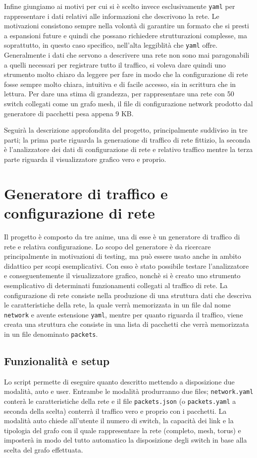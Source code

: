 \documentclass[binding=0.6cm]{sapthesis}
\begin{document}
Infine giungiamo ai motivi per cui si è scelto invece esclusivamente \texttt{yaml} per rappresentare i 
dati relativi alle informazioni che descrivono la rete. Le motivazioni consistono sempre nella volontà
di garantire un formato che si presti a espansioni future e quindi che possano richiedere strutturazioni complesse, ma soprattutto,
in questo caso specifico, nell'alta leggiblità che \texttt{yaml} offre. Generalmente i dati che servono a descrivere una rete non sono mai paragonabili a quelli
necessari per registrare tutto il traffico, si voleva dare quindi uno strumento molto chiaro da leggere per fare in modo che la configurazione di rete
fosse sempre molto chiara, intuitiva e di facile accesso, sia in scrittura che in lettura. 
Per dare una stima di grandezza, per rappresentare una rete con 50 switch collegati come un grafo mesh, il file
di configurazione network prodotto dal generatore di pacchetti pesa appena 9 KB.


Seguirà la descrizione approfondita del progetto, principalmente suddiviso in tre parti; la prima 
parte riguarda la generazione di traffico di rete fittizio, la seconda è l'analizzatore dei dati di configurazione di rete e relativo traffico mentre la terza
parte riguarda il visualizzatore grafico vero e proprio.

\chapter{Generatore di traffico e configurazione di rete}

Il progetto è composto da tre anime, una di esse è un generatore di traffico di rete e relativa configurazione.
Lo scopo del generatore è da ricercare principalmente in motivazioni di testing, ma può essere
 usato anche in ambito didattico per scopi
esemplicativi. Con esso è stato possibile testare l'analizzatore e conseguentemente il visualizzatore grafico, nonchè si è creato 
uno strumento esemplicativo di determinati funzionamenti collegati al traffico di rete.
La configurazione di rete consiste nella produzione di una struttura dati che descriva 
le caratteristiche della rete, la quale
verrà memorizzata in un file dal nome \texttt{network} e avente estensione \texttt{yaml}, mentre per quanto
riguarda il traffico, viene creata una struttura che consiste in una lista di pacchetti che verrà memorizzata in un file denominato \texttt{packets}.

\section{Funzionalità e setup} 
Lo script permette di eseguire quanto descritto mettendo a
 disposizione due modalità, auto e user. Entrambe le modalità produrranno due files; 
 \texttt{network.yaml} conterà le caratteristiche della rete e il file \texttt{packets.json} (o \texttt{packets.yaml}
 a seconda della scelta) conterrà il traffico vero e proprio con i pacchetti. La modalità auto chiede all'utente il numero di switch, la capacità dei
  link e la tipologia del grafo con il quale rappresentare la rete (completo, mesh, torus) e
   imposterà in modo del tutto automatico
   la disposizione degli switch in base alla scelta del grafo effettuata. 
\end{document}
